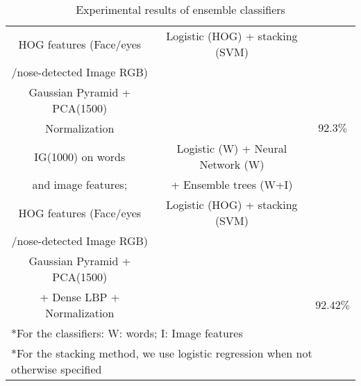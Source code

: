 \begin{table}[h!]
\begin{tabular}{ c c c}
HOG features (Face/eyes & Logistic (HOG) + stacking (SVM) &\\
/nose-detected Image RGB) & &  \\ 
Gaussian Pyramid + PCA(1500) & & \\
Normalization & & $92.3\%$  \\ \hline
IG(1000) on words & Logistic (W) + Neural Network (W) & \\ 
and image features; & + Ensemble trees (W+I) & \\
HOG features (Face/eyes & Logistic (HOG) + stacking (SVM) &\\
/nose-detected Image RGB) & &  \\ 
Gaussian Pyramid + PCA(1500) & & \\
+ Dense LBP + Normalization & & $92.42\%$  \\ \hline
\multicolumn{3}{l}{*For the classifiers: W: words; I: Image features} \\
\multicolumn{3}{l}{*For the stacking method, we use logistic regression when not otherwise specified} \\
\hline
\end{tabular}
\caption{Experimental results of ensemble classifiers}
\label{Table 2}
\end{table}


